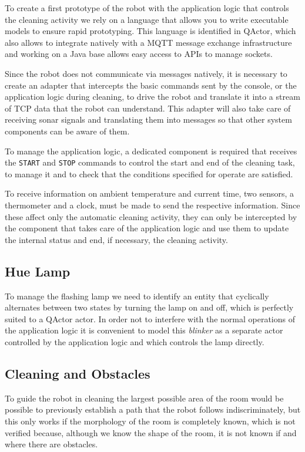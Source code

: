 To create a first prototype of the robot with the application logic that controls the cleaning activity we rely on a language that allows you to write executable models to ensure rapid prototyping. This language is identified in QActor, which also allows to integrate natively with a MQTT message exchange infrastructure and working on a Java base allows easy access to APIs to manage sockets.

Since the robot does not communicate via messages natively, it is necessary to create an adapter that intercepts the basic commands sent by the console, or the application logic during cleaning, to drive the robot and translate it into a stream of TCP data that the robot can understand. This adapter will also take care of receiving sonar signals and translating them into messages so that other system components can be aware of them.

To manage the application logic, a dedicated component is required that receives the \texttt{START} and \texttt{STOP} commands to control the start and end of the cleaning task, to manage it and to check that the conditions specified for operate are satisfied.

To receive information on ambient temperature and current time, two sensors, a thermometer and a clock, must be made to send the respective information. Since these affect only the automatic cleaning activity, they can only be intercepted by the component that takes care of the application logic and use them to update the internal status and end, if necessary, the cleaning activity.

\subsection{Hue Lamp}
To manage the flashing lamp we need to identify an entity that cyclically alternates between two states by turning the lamp on and off, which is perfectly suited to a QActor actor. In order not to interfere with the normal operations of the application logic it is convenient to model this \textit{blinker} as a separate actor controlled by the application logic and which controls the lamp directly.

\subsection{Cleaning and Obstacles}
To guide the robot in cleaning the largest possible area of ​​the room would be possible to previously establish a path that the robot follows indiscriminately, but this only works if the morphology of the room is completely known, which is not verified because, although we know the shape of the room, it is not known if and where there are obstacles.

